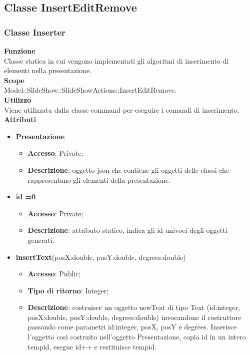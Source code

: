 \subsection{Classe InsertEditRemove}{
	\subsubsection{Classe Inserter}{
		\textbf{Funzione}\\
			\indent Classe statica in cui vengono implementati gli algoritmi di inserimento di elementi nella presentazione.\\
	   	\textbf{Scope}\\
			\indent Model::SlideShow::SlideShowActions::InsertEditRemove.\\
		\textbf{Utilizzo}\\
			\indent Viene utilizzata dalla classe command per eseguire i comandi di inserimento.\\
		\textbf{Attributi}
		\begin{itemize}
			\item \textbf{Presentazione}
			\begin{itemize}
				\item \textbf{Accesso}: Private;
				\item \textbf{Descrizione}: oggetto json che contiene gli oggetti delle classi che rappresentano gli elementi della presentazione.
			\end{itemize}
			\item \textbf{id =0}
			\begin{itemize}
				\item \textbf{Accesso}: Private;
				\item \textbf{Descrizione}: attributo statico, indica gli id univoci degli oggetti generati.
			\end{itemize}
		\end{itemize}
		\begin{itemize}
			\item \textbf{insertText}(posX:double, posY:double, degrees:double)
			\begin{itemize}
				\item \textbf{Accesso}: Public;
				\item \textbf{Tipo di ritorno}: Integer;
				\item \textbf{Descrizione}: costruisce un oggetto newText di tipo Text (id:integer, posX:double, posY:double, degrees:double) invocandone il costruttore passando come parametri id:integer, posX, posY e degrees. Inserisce l’oggetto così costruito nell’oggetto Presentazione, copia id in un intero tempid, esegue id++ e restituisce tempid.

\end{itemize}
\end{itemize}}}
